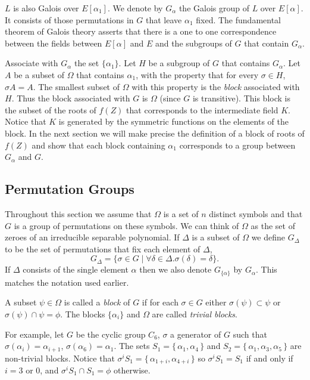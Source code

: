 $L$ is also Galois over $E[\alpha_1]$.  We denote by $G_{\alpha}$ the
Galois group of $L$ over $E[\alpha]$.  It consists of those
permutations in $G$ that leave $\alpha_1$ fixed.  The fundamental
theorem of Galois theory asserts that there is a one to one
correspondence between the fields between $E[\alpha]$ and $E$ and the
subgroups of $G$ that contain $G_{\alpha}$.

Associate with $G_{\alpha}$ the set $\{\alpha_1\}$.  Let $H$ be a
subgroup of $G$ that contains $G_{\alpha}$.  Let $A$ be a subset of
$\Omega$ that contains $\alpha_1$, with the property that for every
$\sigma \in H$, $\sigma A = A$.  The smallest subset of $\Omega$ with
this property is the {\em block} associated with $H$.  Thus the block
associated with $G$ is $\Omega$ (since $G$ is transitive).  This block
is the subset of the roots of $f(Z)$ that corresponds to the
intermediate field $K$.  Notice that $K$ is generated by the
symmetric functions on the elements of the block.  In the next
section we will make precise the definition of a block of roots of
$f(Z)$ and show that each block containing $\alpha_1$ corresponds to a
group between $G_{\alpha}$ and $G$.

\subsection{Permutation Groups}
Throughout this section we assume that $\Omega$ is a set of $n$
distinct symbols and that $G$ is a group of permutations on these
symbols.  We can think of $\Omega$ as the set of zeroes of an
irreducible separable polynomial.  If $\Delta$ is a subset of $\Omega$
we define $G_{\Delta}$ to be the set of permutations that fix each
element of $\Delta$, \ie
\[
G_{\Delta} = \{ \sigma \in G \mid \forall \delta \in \Delta.
\sigma(\delta) = \delta\}.
\]
If $\Delta$ consists of the single element $\alpha$ then we also
denote $G_{\{\alpha\}}$ by $G_{\alpha}$.  This matches the notation
used earlier.

A subset  $\psi \in \Omega$ is called a {\em block} of $G$ if for
each $\sigma \in G$ either $\sigma(\psi)  \subset \psi$ or $\sigma(\psi)
\cap \psi = \phi$.  The blocks $\{\alpha_i \}$ and $\Omega$ are
called {\em trivial blocks\/}.

For example, let $G$ be the cyclic group $C_6$, $\sigma$ a generator
of $G$ such that $\sigma(\alpha_i) = \alpha_{i+1}$, $\sigma(\alpha_6)
= \alpha_1$.  The sets $S_1 = \{\,\alpha_1, \alpha_4\,\}$ and $S_2 =
\{\,\alpha_1, \alpha_3, \alpha_5\,\}$ are non-trivial blocks.  Notice
that $\sigma^i S_1 = \{\, \alpha_{1+i}, \alpha_{4+i}\,\}$ so $\sigma^i
S_1 = S_1$ if and only if $i = 3$ or $0$, and $\sigma^i S_1 \cap S_1 = \phi$
otherwise.


